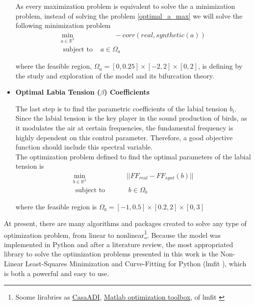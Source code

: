 \begin{itemize}
As every maximization problem is equivalent to solve the a minimization problem, instead of solving the problem \eqref{optimal_a_max} we will solve the following minimization problem
\begin{equation}\label{optimal_a_min}
\begin{aligned}
\underset{a \in \mathbb{R}^3}{\text{min}} &  \qquad - corr (real, synthetic(a))  \\
    \text { subject to }  & a\in\Omega_a
\end{aligned}
\end{equation}

where the feasible region, $\Omega_a = [0, 0.25] \times [-2,2] \times [0,2]$, is defining by the study and exploration of the model and its bifurcation theory.

\item \textbf{Optimal Labia Tension ($\beta$) Coefficients}

The last step is to find the parametric coefficients of the labial tension $b_i$. Since the labial tension is the key player in the sound production of birds, as it modulates the air at certain frequencies, the fundamental frequency is highly dependent on this control parameter. Therefore, a good objective function should include this spectral variable. \\

The optimization problem defined to find the optimal parameters of the labial tension is
\begin{equation}\label{optimal_b}
\begin{aligned}
\underset{b \in \mathbb{R}^3}{\text{min}} &\qquad || FF_{real} - FF_{synt} (b)||  \\
    \text { subject to }  & \qquad \; b \in \Omega_b
\end{aligned}
\end{equation}

where the feasible region is $\Omega_b = [-1,0.5]\times[0.2,2]\times[0,3]$
\end{itemize}

At present, there are many algorithms and packages created to solve any type of optimization problem, from linear to nonlinear\footnote{Soome lirabries as \href{https://web.casadi.org/}{CasaADI}, \href{mathworks.com/products/optimization.html}{Matlab optimization toolbox}, of lmfit \cite{lmfit}}.
Because the model was implemented in Python and after a literature review, the most appropriated library to solve the optimization problems presented in this work is the Non-Linear Least-Squares Minimization and Curve-Fitting for Python (lmfit \cite{lmfit}), which is both a powerful and easy to use.
